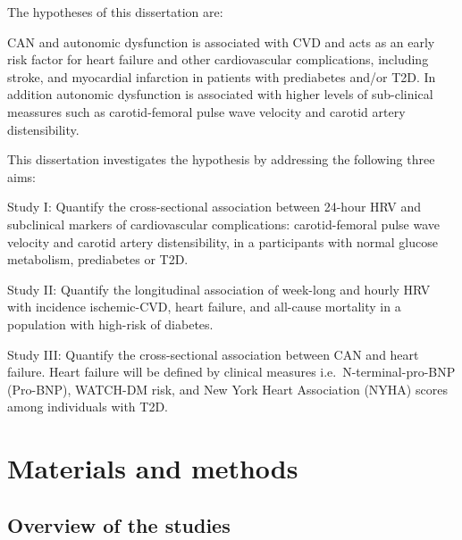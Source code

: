 \documentclass[
  a4paper,
  headsepline=true,
  open=any]{scrbook}
\begin{document}
The hypotheses of this dissertation are:

CAN and autonomic dysfunction is associated with CVD and acts as an
early risk factor for heart failure and other cardiovascular
complications, including stroke, and myocardial infarction in patients
with prediabetes and/or T2D. In addition autonomic dysfunction is
associated with higher levels of sub-clinical meassures such as
carotid-femoral pulse wave velocity and carotid artery distensibility.

This dissertation investigates the hypothesis by addressing the
following three aims:

Study I: Quantify the cross-sectional association between 24-hour HRV
and subclinical markers of cardiovascular complications: carotid-femoral
pulse wave velocity and carotid artery distensibility, in a participants
with normal glucose metabolism, prediabetes or T2D.

Study II: Quantify the longitudinal association of week-long and hourly
HRV with incidence ischemic-CVD, heart failure, and all-cause mortality
in a population with high-risk of diabetes.

Study III: Quantify the cross-sectional association between CAN and
heart failure. Heart failure will be defined by clinical measures
i.e.~N-terminal-pro-BNP (Pro-BNP), WATCH-DM risk, and New York Heart
Association (NYHA) scores among individuals with T2D.


\hypertarget{materials-and-methods}{%
\chapter{Materials and methods}\label{materials-and-methods}}

\hypertarget{overview-of-the-studies}{%
\section{Overview of the studies}\label{overview-of-the-studies}}
\end{document}
